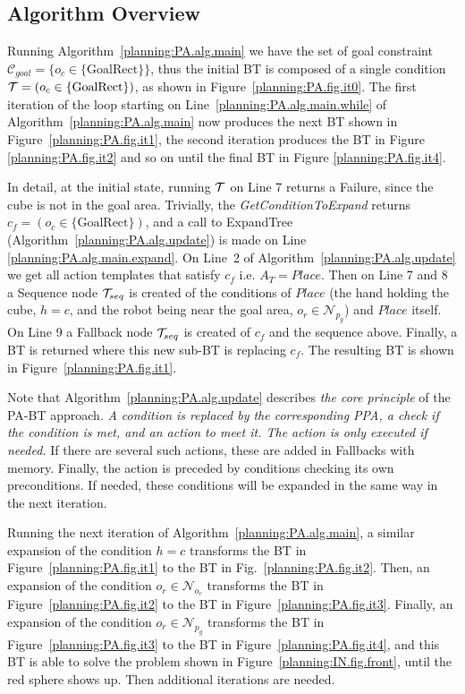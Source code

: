 \subsection{Algorithm Overview}
Running Algorithm~\ref{planning:PA.alg.main} we have the set of goal constraint  $\mathcal{C}_{goal} = \{o_c \in \{\mbox{GoalRect}\} \}$, thus the initial BT
is composed of a single condition
 $\mathcal{T} = (o_c \in \{\mbox{GoalRect}\})$, as shown in Figure~\ref{planning:PA.fig.it0}.
 The first iteration of the loop starting on Line~\ref{planning:PA.alg.main.while} of Algorithm~\ref{planning:PA.alg.main} now produces the next BT shown in Figure~\ref{planning:PA.fig.it1}, the second iteration produces the BT in Figure \ref{planning:PA.fig.it2} and so on until the final BT in Figure \ref{planning:PA.fig.it4}.

In detail, at the initial state, running $\mathcal{T}$ on Line 7 %
returns a Failure, since the cube is not in the goal area. Trivially, the \emph{GetConditionToExpand} returns  $c_f=(o_c \in \{\mbox{GoalRect}\})$,
and a call to ExpandTree (Algorithm~\ref{planning:PA.alg.update}) is made on Line \ref{planning:PA.alg.main.expand}. 
On Line~2 of Algorithm~\ref{planning:PA.alg.update} we get  all action templates that satisfy $c_f$ i.e. $A_T=Place$.
Then on Line 7 and 8 a Sequence node $\mathcal{T}_{seq}$ is created of the conditions of $Place$ (the hand holding the cube, $h = c$, and the robot being near the goal area, $o_r \in \mathcal{N}_{p_g}$) and $Place$ itself.
On Line 9 a Fallback node $\mathcal{T}_{seq}$ is created of $c_f$ and the sequence above.
Finally, a BT is returned where this new sub-BT is replacing $c_f$.
The resulting BT is shown in Figure~\ref{planning:PA.fig.it1}. 

Note that Algorithm~\ref{planning:PA.alg.update} describes \emph{the core principle} of the PA-BT approach. \emph{A condition is replaced by the corresponding PPA, a check if the condition is met, and an action 
to meet it. The action is only executed if needed.} If there are several such actions, these are added in Fallbacks {with memory}. Finally, the action is preceded by conditions checking its own preconditions. If needed,
these conditions will be expanded in the same way in the next iteration.

Running the next iteration of Algorithm~\ref{planning:PA.alg.main}, a similar expansion of the condition $h = c$ transforms the BT in Figure~\ref{planning:PA.fig.it1} to the BT in Fig.~\ref{planning:PA.fig.it2}.
Then, an expansion of the condition $o_r \in \mathcal{N}_{o_c}$ transforms the BT in Figure~\ref{planning:PA.fig.it2} to the BT in Figure~\ref{planning:PA.fig.it3}.
Finally, an expansion of the condition $o_r \in \mathcal{N}_{p_g}$ transforms the BT in Figure~\ref{planning:PA.fig.it3} to the BT in Figure~\ref{planning:PA.fig.it4},
and this BT is able to solve the problem shown in Figure~\ref{planning:IN.fig.front}, until the red sphere shows up.
Then additional iterations are needed.
 




